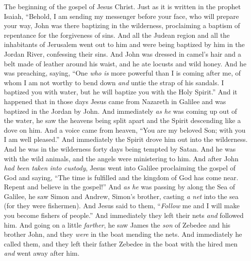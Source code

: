 
\begin{biblechapter} %
 The beginning of the gospel of Jesus Christ.
\verse Just as it is written in the prophet Isaiah,
\verse “Behold, I am sending my messenger before your face, 
who will prepare your way,
\verse John was there baptizing in the wilderness, proclaiming a baptism of repentance for the forgiveness of sins.
\verse And all the Judean region and all the inhabitants of Jerusalem went out to him and were being baptized by him in the Jordan River, confessing their sins.
\verse And John was dressed in camel’s hair and a belt made of leather around his waist, and he ate locusts and wild honey.
\verse And he was preaching, saying, “One \textit{who is} more powerful than I is coming after me, of whom I am not worthy to bend down \textit{and} untie the strap of his sandals.
\verse I baptized you with water, but he will baptize you with the Holy Spirit.”
 And it happened that in those days Jesus came from Nazareth in Galilee and was baptized in the Jordan by John.
\verse And immediately \textit{as he} was coming up out of the water, he saw the heavens being split apart and the Spirit descending like a dove on him.
\verse And a voice came from heaven, “You are my beloved Son; with you I am well pleased.”
 And immediately the Spirit drove him out into the wilderness.
\verse And he was in the wilderness forty days being tempted by Satan. And he was with the wild animals, and the angels were ministering to him.
 And after John \textit{had been taken into custody}, Jesus went into Galilee proclaiming the gospel of God
\verse and saying, “The time is fulfilled and the kingdom of God has come near. Repent and believe in the gospel!”
 And \textit{as he} was passing by along the Sea of Galilee, he saw Simon and Andrew, Simon’s brother, casting \textit{a net} into the sea (for they were fishermen).
\verse And Jesus said to them, “\textit{Follow} me and I will make you become fishers of people.”
\verse And immediately they left their nets \textit{and} followed him.
\verse And going on a little \textit{farther}, he saw James the \textit{son} of Zebedee and his brother John, and they \textit{were} in the boat mending the nets.
\verse And immediately he called them, and they left their father Zebedee in the boat with the hired men \textit{and} went away after him.

\end{biblechapter}
